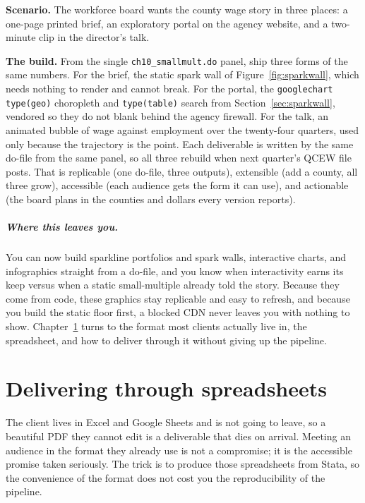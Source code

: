 \documentclass[
    a4paper,
    fontsize=10pt,
    twoside=true,
    numbers=noenddot,
]{kaobook}
\newcounter{appliedexample}
\newenvironment{appliedexample}[1][]{%
    \refstepcounter{appliedexample}%
    \begin{appliedexamplebox}[frametitle={Applied Example~\theappliedexample.~~#1}]%
}{%
    \end{appliedexamplebox}%
}
\begin{document}
\begin{appliedexample}[One dataset, three deliverables]
\textbf{Scenario.} The workforce board wants the county wage story in three places: a one-page printed brief, an exploratory portal on the agency website, and a two-minute clip in the director's talk.

\medskip
\textbf{The build.} From the single \texttt{ch10\_smallmult.do} panel, ship three forms of the same numbers. For the brief, the static spark wall of Figure~\ref{fig:sparkwall}, which needs nothing to render and cannot break. For the portal, the \texttt{googlechart type(geo)} choropleth and \texttt{type(table)} search from Section~\ref{sec:sparkwall}, vendored so they do not blank behind the agency firewall. For the talk, an animated bubble of wage against employment over the twenty-four quarters, used only because the trajectory is the point. Each deliverable is written by the same do-file from the same panel, so all three rebuild when next quarter's QCEW file posts. That is replicable (one do-file, three outputs), extensible (add a county, all three grow), accessible (each audience gets the form it can use), and actionable (the board plans in the counties and dollars every version reports).
\end{appliedexample}

\paragraph{Where this leaves you.} You can now build sparkline portfolios and spark walls, interactive charts, and infographics straight from a do-file, and you know when interactivity earns its keep versus when a static small-multiple already told the story. Because they come from code, these graphics stay replicable and easy to refresh, and because you build the static floor first, a blocked CDN never leaves you with nothing to show. Chapter~\ref{ch:sheets} turns to the format most clients actually live in, the spreadsheet, and how to deliver through it without giving up the pipeline.
\chapter{Delivering through spreadsheets}\label{ch:sheets}

The client lives in Excel and Google Sheets and is not going to leave, so a beautiful PDF they cannot edit is a deliverable that dies on arrival. Meeting an audience in the format they already use is not a compromise; it is the accessible promise taken seriously. The trick is to produce those spreadsheets from Stata, so the convenience of the format does not cost you the reproducibility of the pipeline.
\end{document}
